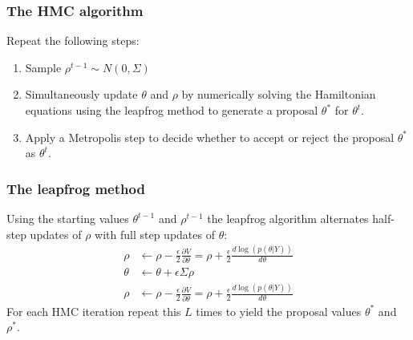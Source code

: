 \documentclass[handout]{beamer}
\begin{document}
\begin{frame}
  \frametitle{The HMC algorithm}
  
Repeat the following steps:
  \begin{enumerate}
  \item Sample  $\rho^{t-1} \sim N\left(0, \Sigma\right)$
\item Simultaneously update $\theta$ and $\rho$ by numerically solving
  the Hamiltonian equations using the leapfrog method to generate a
  proposal $\theta^*$ for $\theta^t$.
\item Apply a Metropolis step to decide whether to
  accept or reject the proposal $\theta^*$ as $\theta^t$.
  \end{enumerate}

\end{frame}

\begin{frame}
  \frametitle{The leapfrog method}

Using the starting values $\theta^{t-1}$ and $\rho^{t-1}$ the leapfrog
algorithm alternates half-step updates of $\rho$ with full step
updates of $\theta$:
\begin{align*}
  \rho &\leftarrow \rho - \frac{\epsilon}{2} \frac{\partial V}{\partial
  \theta} = \rho + \frac{\epsilon}{2} \frac{d\log\left(p\left(\theta |
         Y\right)\right)}{d\theta} \\
\theta &\leftarrow \theta + \epsilon \Sigma \rho \\
  \rho &\leftarrow \rho - \frac{\epsilon}{2} \frac{\partial V}{\partial
  \theta} = \rho + \frac{\epsilon}{2} \frac{d\log\left(p\left(\theta |
         Y\right)\right)}{d\theta} 
\end{align*}
For each HMC iteration repeat this $L$ times to yield the proposal
values $\theta^*$ and $\rho^*$.

\end{frame}
\end{document}
